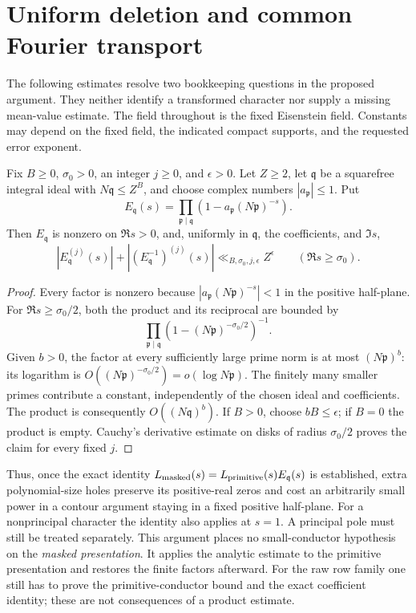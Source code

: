 \section{Uniform deletion and common Fourier transport}
\label{sec:uniform-transport}

The following estimates resolve two bookkeeping questions in the proposed
argument. They neither identify a transformed character nor supply a
missing mean-value estimate. The field throughout is the fixed Eisenstein
field. Constants may depend on the fixed field, the indicated compact
supports, and the requested error exponent.

\begin{proposition}
Fix $B\geq 0$, $\sigma_0>0$, an integer $j\geq0$, and $\epsilon>0$.
Let $Z\geq2$, let $\mathfrak q$ be a squarefree integral ideal with
$N\mathfrak q\leq Z^B$, and choose complex numbers
$|a_{\mathfrak p}|\leq1$. Put
\[
 E_{\mathfrak q}(s)=\prod_{\mathfrak p\mid\mathfrak q}
       (1-a_{\mathfrak p}(N\mathfrak p)^{-s}).
\]
Then $E_{\mathfrak q}$ is nonzero on $\Re s>0$, and, uniformly in
$\mathfrak q$, the coefficients, and $\Im s$,
\[
 |E_{\mathfrak q}^{(j)}(s)|+
 |(E_{\mathfrak q}^{-1})^{(j)}(s)|
 \ll_{B,\sigma_0,j,\epsilon} Z^\epsilon
 \qquad(\Re s\geq\sigma_0).
\]
\end{proposition}
\begin{proof}
Every factor is nonzero because
$|a_{\mathfrak p}(N\mathfrak p)^{-s}|<1$ in the positive half-plane.
For $\Re s\geq\sigma_0/2$, both the product and its reciprocal are
bounded by
\[
 \prod_{\mathfrak p\mid\mathfrak q}
       (1-(N\mathfrak p)^{-\sigma_0/2})^{-1}.
\]
Given $b>0$, the factor at every sufficiently large prime norm is at
most $(N\mathfrak p)^b$: its logarithm is
$O((N\mathfrak p)^{-\sigma_0/2})=o(\log N\mathfrak p)$.
The finitely many smaller primes contribute a constant, independently
of the chosen ideal and coefficients. The product is consequently
$O((N\mathfrak q)^b)$. If $B>0$, choose $bB\leq\epsilon$; if $B=0$
the product is empty. Cauchy's derivative estimate on disks of radius
$\sigma_0/2$ proves the claim for every fixed $j$.
\end{proof}

Thus, once the exact identity
$L_{\rm masked}(s)=L_{\rm primitive}(s)E_{\mathfrak q}(s)$ is
established, extra polynomial-size holes preserve its positive-real
zeros and cost an arbitrarily small power in a contour argument staying
in a fixed positive half-plane. For a nonprincipal character the
identity also applies at $s=1$. A principal pole must still be treated
separately. This argument places no small-conductor hypothesis on the
\emph{masked presentation}. It applies the analytic estimate to the
primitive presentation and restores the finite factors afterward.
For the raw row family one still has to prove the primitive-conductor
bound and the exact coefficient identity; these are not consequences
of a product estimate.

